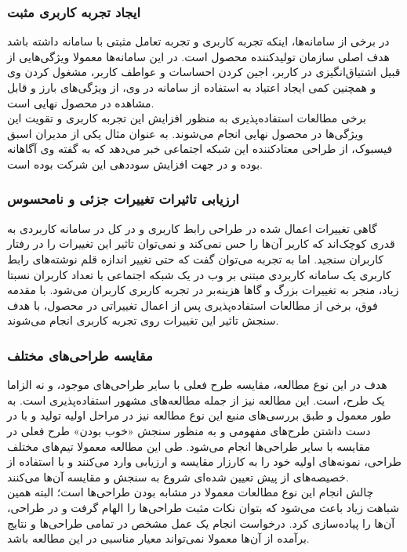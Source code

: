 \subsubsection{ایجاد تجربه کاربری مثبت}
در برخی از سامانه‌ها، اینکه تجربه کاربری و تجربه تعامل مثبتی با سامانه داشته باشد هدف اصلی سازمان تولیدکننده محصول است. در این سامانه‌ها معمولا ویژگی‌هایی از قبیل اشتیاق‌انگیزی در کاربر، اجین کردن احساسات و عواطف کاربر، مشغول کردن وی و همچنین کمی ایجاد اعتیاد به استفاده از سامانه در وی، از ویژگی‌های بارز و قابل مشاهده در محصول نهایی است.\\
برخی مطالعات استفاده‌پذیری به منظور افزایش این تجربه کاربری و تقویت این ویژگی‌ها در محصول نهایی انجام می‌شوند. به عنوان مثال یکی از مدیران اسبق فیسبوک، از طراحی معتادکننده این شبکه اجتماعی خبر می‌دهد
\cite{noauthor_sean_nodate}
که به گفته وی آگاهانه بوده و در جهت افزایش سوددهی این شرکت بوده است.
\subsubsection{ارزیابی تاثیرات تغییرات جزئی و نامحسوس}
گاهی تغییرات اعمال شده در طراحی رابط  کاربری و در کل در سامانه کاربردی به قدری کوچک‌اند که کاربر آن‌ها را حس نمی‌کند و نمی‌توان تاثیر این تغییرات را در رفتار کاربران سنجید. اما به تجربه
\cite{albert_measuring_2013}
می‌توان گفت که حتی تغییر اندازه قلم نوشته‌های رابط کاربری یک سامانه کاربردی مبتنی بر وب در یک شبکه اجتماعی با تعداد کاربران نسبتا زیاد، منجر به تغییرات  بزرگ و گاها هزینه‌بر در تجربه کاربری کاربران می‌شود. با مقدمه فوق، برخی از مطالعات استفاده‌پذیری پس از اعمال تغییراتی در محصول، با هدف سنجش تاثیر این تغییرات روی تجربه کاربری انجام می‌شوند.
\subsubsection{مقایسه طراحی‌های مختلف}
هدف در این نوع مطالعه، مقایسه طرح فعلی با سایر طراحی‌های موجود، و نه الزاما یک طرح، است. این مطالعه نیز از جمله مطالعه‌های مشهور استفاده‌پذیری است. به طور معمول و طبق بررسی‌های منبع
\cite{albert_measuring_2013}
این نوع مطالعه نیز در مراحل اولیه تولید و با در دست داشتن طرح‌های مفهومی و به منظور سنجش «خوب بودن» طرح فعلی در مقایسه با سایر طراحی‌ها انجام می‌شود. طی این مطالعه معمولا تیم‌های مختلف طراحی، نمونه‌های اولیه
خود را به کارزار مقایسه و ارزیابی وارد می‌کنند و با استفاده از خصیصه‌های از پیش تعیین شده‌ای شروع به سنجش و مقایسه آن‌ها می‌کنند.\\
چالش انجام این نوع مطالعات معمولا در مشابه بودن طراحی‌ها است؛ البته همین شباهت زیاد باعث می‌شود که بتوان نکات مثبت طراحی‌ها را الهام گرفت و در طراحی، آن‌ها را پیاده‌سازی کرد. درخواست انجام یک عمل مشخص در تمامی طراحی‌ها و نتایج برآمده از آن‌ها معمولا نمی‌تواند معیار مناسبی در این مطالعه باشد.
